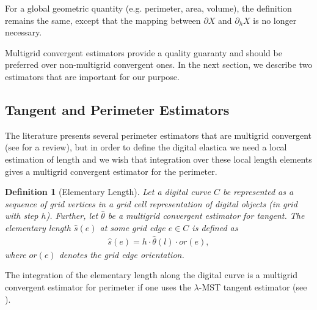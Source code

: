 \documentclass[runningheads]{llncs}
\newtheorem{ddef}{Definition}
\begin{document}
For a global geometric quantity (e.g. perimeter, area, volume), the definition remains the same, except that the mapping
between $\partial X$ and $\partial_h X$ is no longer necessary.
	
Multigrid convergent estimators provide a quality guaranty and should be preferred over non-multigrid convergent
ones. In the next section, we describe two estimators that are important for our purpose.

\subsection{Tangent and Perimeter Estimators}

The literature presents several perimeter estimators that are multigrid convergent (see
\cite{coeurjolly04,coeurjolly12} for a review), but in order to define the digital elastica we need a local estimation
of length and we wish that integration over these local length elements gives a multigrid convergent estimator for the
perimeter.

\begin{ddef}[Elementary Length]
  Let a digital curve $C$ be represented as a sequence of grid vertices in a grid cell representation of digital objects (in grid with step $h$). Further, let $\hat{\theta}$ be a multigrid convergent estimator for tangent. The elementary length $\hat{s}(e)$ at some grid edge $e\in C$ is defined as
  \begin{align*}
    \hat{s}(e) = h \cdot \hat{\theta}(l) \cdot or(e),
  \end{align*}
  where $or(e)$ denotes the grid edge orientation.
\end{ddef}
The integration of the elementary length along the digital curve is a multigrid convergent estimator for perimeter if
one uses the $\lambda$-MST \cite{lachaud07} tangent estimator (see \cite{lachaud06}).
\end{document}
